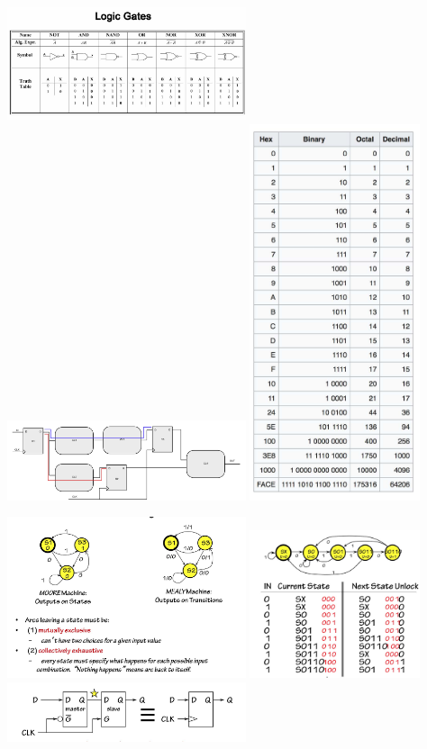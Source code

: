 \documentclass[9pt,landscape]{extarticle}
\begin{document}
\begin{multicols*}{4}
\setlength{\premulticols}{1pt}
\setlength{\postmulticols}{1pt}
\setlength{\multicolsep}{1pt}
\setlength{\columnsep}{2pt}
\includegraphics[width = 7cm]{Logic_gates}
\includegraphics[width = 7cm]{CLK}
\includegraphics[width = 5cm]{Conversion_table}

\includegraphics[width = 7cm]{State_machine}
\includegraphics[width = 5cm]{state_transition}
\includegraphics[width = 7cm]{Flip_flop_Diagram}


\end{multicols*}
\end{document}
